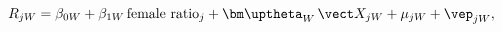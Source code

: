 \begin{equation}\label{equation4}
	R_{jW}=\beta_{0W}+\beta_{1W}\,\text{female ratio}_j+\bm\uptheta_W\,\vect X_{jW}+\mu_{jW}+\vep_{jW},
\end{equation}